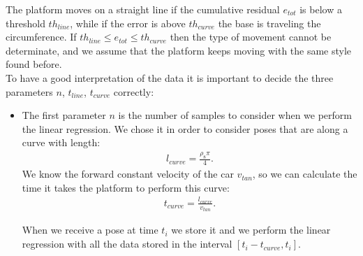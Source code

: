 The platform moves on a straight line if the cumulative residual $e_{tot}$ is below a threshold $th_{line}$, while if the error is above $th_{curve}$ the base is traveling the circumference. If $th_{line} \leq e_{tot} \leq th_{curve}$ then the type of movement cannot be determinate, and we assume that the platform keeps moving with the same style found before.\\

To have a good interpretation of the data it is important to decide the three parameters $n$, $t_{line}$, $t_{curve}$ correctly:
\begin{itemize}
\item The first parameter $n$ is the number of samples to consider when we perform the linear regression. We chose it in order to consider poses that are along a curve with length:
\begin{align}
l_{curve} = \frac{\rho_8\pi}{4}. \label{eq:lengthcurve} 
\end{align}
We know the forward constant velocity of the car $v_{tan}$, so we can calculate the time it takes the platform to perform this curve:
\begin{align}
t_{curve} = \frac{l_{curve}}{v_{tan}}. \label{eq:timecurve} 
\end{align}

When we receive a pose at time $t_i$ we store it and we perform the linear regression with all the data stored in the interval $[t_i-t_{curve},t_i]$.


\end{itemize}
